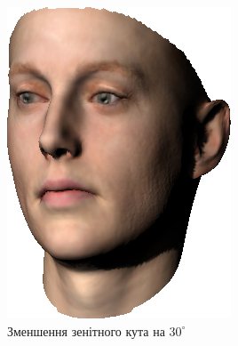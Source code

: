 \begin{figure}[h]
  \centering
  \begin{subfigure}[b]{0.4\textwidth}
    \centering
    \includegraphics[width=\textwidth]{images/face_shaded_3}
    \caption{Зменшення зенітного кута на $30^{\circ}$}
  \end{subfigure}
  \begin{subfigure}[b]{0.4\textwidth}
    \centering

\end{subfigure}
\end{figure}
